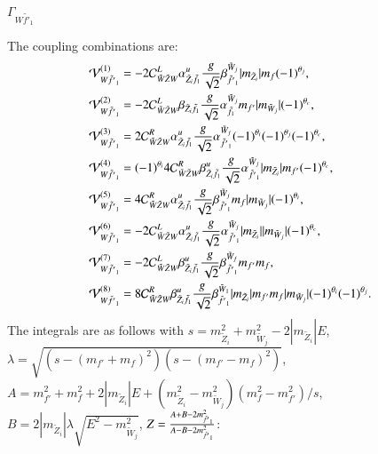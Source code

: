 \documentclass[final,3p,times,pdflatex]{elsarticle}
\begin{document}
\textbf{\underline{$\Gamma_{W \tilde{f'}_1}$}}

The coupling combinations are:
\begin{align}
\mathcal{V}_{W \tilde{f'}_1}^{(1)} &= -2 \mathcal{C}_{\tilde{W} \tilde{Z} W}^L \alpha_{\tilde{Z}_i \tilde{f}_1}^{u} {g \over \sqrt{2}} \beta_{\tilde{f'}_1}^{\tilde{W}_j}|m_{\tilde{Z}_i}|m_{f}(-1)^{\theta_j}, \\
\mathcal{V}_{W \tilde{f'}_1}^{(2)} &= -2 \mathcal{C}_{\tilde{W} \tilde{Z} W}^L \beta_{\tilde{Z}_i \tilde{f}_1} {g \over \sqrt{2}} \alpha_{\tilde{f}_1}^{\tilde{W}_j} m_{f'}|m_{\tilde{W}_j}|(-1)^{\theta_c}, \\
\mathcal{V}_{W \tilde{f'}_1}^{(3)} &= 2 \mathcal{C}_{\tilde{W} \tilde{Z} W}^R \alpha_{\tilde{Z}_i \tilde{f}_1}^{u} {g \over \sqrt{2}} \alpha_{\tilde{f'}_1}^{\tilde{W}_j}(-1)^{\theta_i}(-1)^{\theta_j}(-1)^{\theta_c}, \\
\mathcal{V}_{W \tilde{f'}_1}^{(4)} &= (-1)^{\theta_i}4 \mathcal{C}_{\tilde{W} \tilde{Z} W}^R \beta_{\tilde{Z}_i \tilde{f}_1}^{u} {g \over \sqrt{2}} \alpha_{\tilde{f'}_1}^{\tilde{W}_j}|m_{\tilde{Z}_i}|m_{f'}(-1)^{\theta_c}, \\
\mathcal{V}_{W \tilde{f'}_1}^{(5)} &= 4 \mathcal{C}_{\tilde{W} \tilde{Z} W}^R \alpha_{\tilde{Z}_i \tilde{f}_1}^{u} {g \over \sqrt{2}} \beta_{\tilde{f'}_1}^{\tilde{W}_j}m_{f}|m_{\tilde{W}_j}|(-1)^{\theta_i}, \\
\mathcal{V}_{W \tilde{f'}_1}^{(6)} &= -2 \mathcal{C}_{\tilde{W} \tilde{Z} W}^L \alpha_{\tilde{Z}_i \tilde{f}_1}^{u} {g \over \sqrt{2}} \alpha_{\tilde{f'}_1}^{\tilde{W}_j}|m_{\tilde{Z}_i}||m_{\tilde{W}_j}|(-1)^{\theta_c}, \\
\mathcal{V}_{W \tilde{f'}_1}^{(7)} &= -2 \mathcal{C}_{\tilde{W} \tilde{Z} W}^L \beta_{\tilde{Z}_i \tilde{f}_1}^{u} {g \over \sqrt{2}} \beta_{\tilde{f'}_1}^{\tilde{W}_f} m_{f'}m_{f}, \\ 
\mathcal{V}_{W \tilde{f'}_1}^{(8)} &= 8 \mathcal{C}_{\tilde{W} \tilde{Z} W}^R \beta_{\tilde{Z}_i \tilde{f}_1}^{u} {g \over \sqrt{2}} \beta_{\tilde{f'}_1}^{\tilde{W}_1} |m_{\tilde{Z}_i}|m_{f'} m_{f}|m_{\tilde{W}_j}|(-1)^{\theta_i}(-1)^{\theta_j}. \\
\end{align}
The integrals are as follows with $s = m_{\tilde{Z}_i}^2 + m_{\tilde{W}_j}^2 - 2|m_{\tilde{Z}_i}|E$, $\lambda = \sqrt{(s-(m_{f'}+m_{f})^2)(s-(m_{f'}-m_{f})^2)}$, $A = m_{f'}^2 + m_{f}^2 + 2|m_{\tilde{Z}_i}|E + (m_{\tilde{Z}_i}^2 - m_{\tilde{W}_j}^2)(m_{f}^2 - m_{f'}^2)/s$, $B = 2|m_{\tilde{Z}_i}| \lambda \sqrt{E^2-m_{\tilde{W}_j}^2} $, $Z = {A + B - 2m_{\tilde{f'}_1}^2 \over A - B - 2m_{\tilde{f'}_1}^2}$:
\end{document}

